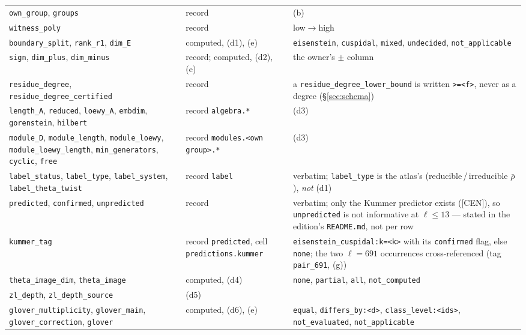 \documentclass[11pt]{article}
\theoremstyle{remark}
\begin{document}
\begin{enumerate}[label=(\alph*)]
\begin{longtable}{@{}>{\raggedright\arraybackslash}p{3.7cm}>{\raggedright\arraybackslash}p{3.3cm}>{\raggedright\arraybackslash}p{7.2cm}@{}}
  \texttt{own\_group}, \texttt{groups} & record & (b) \\
  \texttt{witness\_poly} & record & low$\to$high \\
  \texttt{boundary\_split}, \texttt{rank\_r1}, \texttt{dim\_E} & computed, (d1), (e) & \texttt{eisenstein}, \texttt{cuspidal}, \texttt{mixed}, \texttt{undecided}, \texttt{not\_applicable} \\
  \texttt{sign}, \texttt{dim\_plus}, \texttt{dim\_minus} & record; computed, (d2), (e) & the owner's $\pm$ column \\
  \texttt{residue\_degree}, \texttt{residue\_degree\_certified} & record & a \texttt{residue\_degree\_lower\_bound} is written \texttt{>=<f>}, never as a degree (\S\ref{sec:schema}) \\
  \texttt{length\_A}, \texttt{reduced}, \texttt{loewy\_A}, \texttt{embdim}, \texttt{gorenstein}, \texttt{hilbert} & record \texttt{algebra.*} & (d3) \\
  \texttt{module\_D}, \texttt{module\_length}, \texttt{module\_loewy}, \texttt{module\_loewy\_length}, \texttt{min\_generators}, \texttt{cyclic}, \texttt{free} & record \texttt{modules.<own group>.*} & (d3) \\
  \texttt{label\_status}, \texttt{label\_type}, \texttt{label\_system}, \texttt{label\_theta\_twist} & record \texttt{label} & verbatim; \texttt{label\_type} is the atlas's (reducible\,/\,irreducible $\bar\rho$), \emph{not} (d1) \\
  \texttt{predicted}, \texttt{confirmed}, \texttt{unpredicted} & record & verbatim; only the Kummer predictor exists ([CEN]), so \texttt{unpredicted} is not informative at $\ell\le13$ --- stated in the edition's \texttt{README.md}, not per row \\
  \texttt{kummer\_tag} & record \texttt{predicted}, cell \texttt{predictions.kummer} & \texttt{eisenstein\_cuspidal:k=<k>} with its \texttt{confirmed} flag, else \texttt{none}; the two $\ell=691$ occurrences cross-referenced (tag \texttt{pair\_691}, (g)) \\
  \texttt{theta\_image\_dim}, \texttt{theta\_image} & computed, (d4) & \texttt{none}, \texttt{partial}, \texttt{all}, \texttt{not\_computed} \\
  \texttt{zl\_depth}, \texttt{zl\_depth\_source} & (d5) & \\
  \texttt{glover\_multiplicity}, \texttt{glover\_main}, \texttt{glover\_correction}, \texttt{glover} & computed, (d6), (e) & \texttt{equal}, \texttt{differs\_by:<d>}, \texttt{class\_level:<ids>}, \texttt{not\_evaluated}, \texttt{not\_applicable} \\

\end{longtable}
\end{enumerate}
\end{document}
